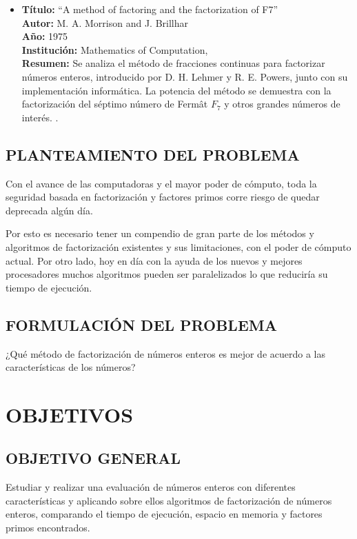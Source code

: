 \begin{itemize}
            \item \textbf{Título:} ``A method of factoring and the
            factorization of F7'' \\
            \textbf{Autor:} M. A. Morrison and J. Brillhar\\
            \textbf{Año:} 1975 \\
            \textbf{Institución:} Mathematics of Computation, \\
            \textbf{Resumen:} Se analiza el método de fracciones continuas para factorizar números enteros, introducido por D. H. Lehmer y R. E. Powers, junto con su implementación informática. La potencia del método se demuestra con la factorización del séptimo número de Fermât $F_7$ y otros grandes números de interés. \citep{Morrison1975}.
        \end{itemize}
    
        \subsection{PLANTEAMIENTO DEL PROBLEMA}
        Con el avance de las computadoras y el mayor poder de cómputo, toda la seguridad basada en factorización y factores primos corre riesgo de quedar deprecada algún día.

        Por esto es necesario tener un compendio de gran parte de los métodos y algoritmos de factorización existentes y sus limitaciones, con el poder de cómputo actual. Por otro lado, hoy en día con la ayuda de los nuevos y mejores procesadores muchos algoritmos pueden ser paralelizados lo que reduciría su tiempo de ejecución.

        \subsection{FORMULACIÓN DEL PROBLEMA}
        ¿Qué método de factorización de números enteros es mejor de acuerdo a las características de los números?
    
    \section{OBJETIVOS}
        \subsection{OBJETIVO GENERAL}
        Estudiar y realizar una evaluación de números enteros con diferentes características y aplicando sobre ellos algoritmos de factorización de números enteros, comparando el tiempo de ejecución, espacio en memoria y factores primos encontrados.

